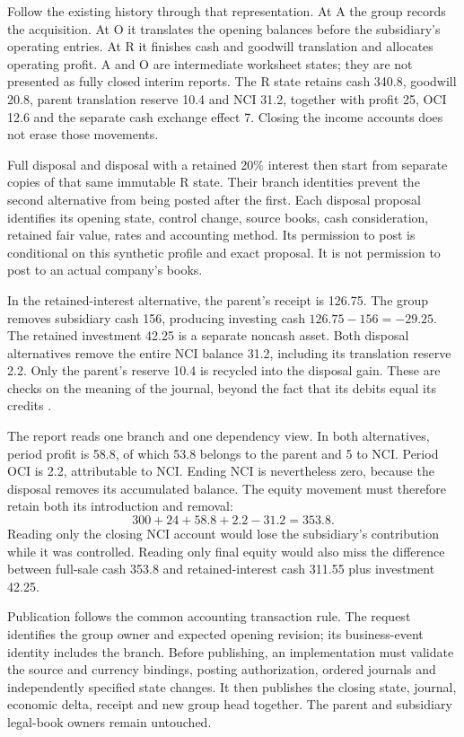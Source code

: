 Follow the existing history through that representation. At A the group
records the acquisition. At O it translates the opening balances before the
subsidiary's operating entries. At R it finishes cash and goodwill
translation and allocates operating profit. A and O are intermediate
worksheet states; they are not presented as fully closed interim reports.
The R state retains cash 340.8, goodwill 20.8, parent translation reserve
10.4 and NCI 31.2, together with profit 25, OCI 12.6 and the separate cash
exchange effect 7. Closing the income accounts does not erase those movements.

Full disposal and disposal with a retained 20\% interest then start from
separate copies of that same immutable R state. Their branch identities
prevent the second alternative from being posted after the first. Each
disposal proposal identifies its opening state, control change, source books,
cash consideration, retained fair value, rates and accounting method.
Its permission to post is conditional on this synthetic profile and exact
proposal. It is not permission to post to an actual company's books.

In the retained-interest alternative, the parent's receipt is 126.75.
The group removes subsidiary cash 156, producing investing cash
$126.75-156=-29.25$. The retained investment 42.25 is a separate noncash
asset. Both disposal alternatives remove the entire NCI balance 31.2,
including its translation reserve 2.2. Only the parent's reserve 10.4 is
recycled into the disposal gain. These are checks on the meaning of the
journal, beyond the fact that its debits equal its credits
\citep[IFRS~10.B98--99; IAS~21.48A--B; IAS~7.39--42]{eu20231803}.

The report reads one branch and one dependency view. In both alternatives,
period profit is 58.8, of which 53.8 belongs to the parent and 5 to NCI.
Period OCI is 2.2, attributable to NCI. Ending NCI is nevertheless zero,
because the disposal removes its accumulated balance. The equity movement
must therefore retain both its introduction and removal:
\[
 300+24+58.8+2.2-31.2=353.8.
\]
Reading only the closing NCI account would lose the subsidiary's contribution
while it was controlled. Reading only final equity would also miss the
difference between full-sale cash 353.8 and retained-interest cash 311.55
plus investment 42.25.

Publication follows the common accounting transaction rule. The request
identifies the group owner and expected opening revision; its business-event
identity includes the branch. Before publishing, an implementation must
validate the source and currency bindings, posting authorization, ordered
journals and independently specified state changes. It then publishes the
closing state, journal, economic delta, receipt and new group head together.
The parent and subsidiary legal-book owners remain untouched.

